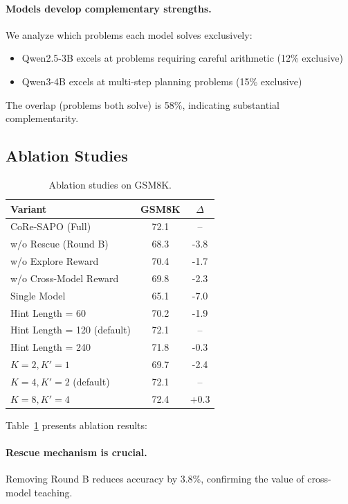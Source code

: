 \documentclass[11pt]{article}
\newcommand{\methodname}{CoRe}
\begin{document}
\paragraph{Models develop complementary strengths.} We analyze which problems each model solves exclusively:
\begin{itemize}
    \item Qwen2.5-3B excels at problems requiring careful arithmetic (12\% exclusive)
    \item Qwen3-4B excels at multi-step planning problems (15\% exclusive)
\end{itemize}
The overlap (problems both solve) is 58\%, indicating substantial complementarity.

\subsection{Ablation Studies}

\begin{table}[t]
    \centering
    \small
    \begin{tabular}{lcc}
        \toprule
        \textbf{Variant} & \textbf{GSM8K} & $\Delta$ \\
        \midrule
        \methodname{}-SAPO (Full) & 72.1 & -- \\
        \quad w/o Rescue (Round B) & 68.3 & -3.8 \\
        \quad w/o Explore Reward & 70.4 & -1.7 \\
        \quad w/o Cross-Model Reward & 69.8 & -2.3 \\
        \quad Single Model & 65.1 & -7.0 \\
        \midrule
        Hint Length = 60 & 70.2 & -1.9 \\
        Hint Length = 120 (default) & 72.1 & -- \\
        Hint Length = 240 & 71.8 & -0.3 \\
        \midrule
        $K=2, K'=1$ & 69.7 & -2.4 \\
        $K=4, K'=2$ (default) & 72.1 & -- \\
        $K=8, K'=4$ & 72.4 & +0.3 \\
        \bottomrule
    \end{tabular}
    \caption{Ablation studies on GSM8K.}
    \label{tab:ablations}
\end{table}

Table~\ref{tab:ablations} presents ablation results:

\paragraph{Rescue mechanism is crucial.} Removing Round B reduces accuracy by 3.8\%, confirming the value of cross-model teaching.
\end{document}
